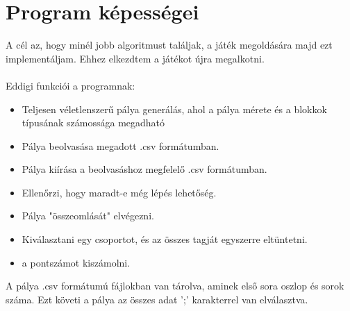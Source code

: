 \documentclass{article}
\begin{document}
	
	\section{Program képességei}
	
	A cél az, hogy minél jobb algoritmust találjak, a játék megoldására majd ezt implementáljam. Ehhez elkezdtem a játékot újra megalkotni.
	\\
	\\	
			
	Eddigi funkciói a programnak:
	\begin{itemize}
		\item Teljesen véletlenszerű pálya generálás, ahol a pálya mérete és a blokkok típusának számossága megadható
		\item Pálya beolvasása megadott .csv formátumban.
		\item Pálya kiírása a beolvasáshoz megfelelő .csv formátumban.
		\item Ellenőrzi, hogy maradt-e még lépés lehetőség.
		\item Pálya "összeomlását" elvégezni.
		\item  Kiválasztani egy csoportot, és az összes tagját egyszerre eltüntetni.
		\item a pontszámot kiszámolni.
	\end{itemize}
	
	A pálya .csv formátumú fájlokban van tárolva, aminek első sora oszlop és sorok száma. Ezt követi a pálya az összes adat ';' karakterrel van elválasztva.
		
	
	
	
\end{document}

